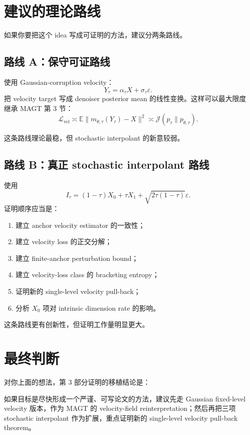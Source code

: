 \documentclass[UTF8,11pt]{ctexart}
\newcommand{\E}{\mathbb{E}}
\begin{document}
\section{建议的理论路线}

如果你要把这个 idea 写成可证明的方法，建议分两条路线。

\subsection{路线 A：保守可证路线}

使用 Gaussian-corruption velocity：
\[
Y_\tau=\alpha_\tau X+\sigma_\tau\varepsilon.
\]
把 velocity target 写成 denoiser posterior mean 的线性变换。这样可以最大限度继承 MAGT 第 3 节：
\[
\mathcal L_{\mathrm{vel}}
\asymp
\E\|m_{\theta,\tau}(Y_\tau)-X\|^2
\asymp
\mathcal J(p_\tau\|p_{\theta,\tau}).
\]

这条路线理论最稳，但 stochastic interpolant 的新意较弱。

\subsection{路线 B：真正 stochastic interpolant 路线}

使用
\[
I_\tau=(1-\tau)X_0+\tau X_1+\sqrt{2\tau(1-\tau)}\varepsilon.
\]
证明顺序应当是：
\begin{enumerate}
\item 建立 anchor velocity estimator 的一致性；
\item 建立 velocity loss 的正交分解；
\item 建立 finite-anchor perturbation bound；
\item 建立 velocity-loss class 的 bracketing entropy；
\item 证明新的 single-level velocity pull-back；
\item 分析 \(X_0\) 项对 intrinsic dimension rate 的影响。
\end{enumerate}

这条路线更有创新性，但证明工作量明显更大。

\section{最终判断}

对你上面的想法，第 3 部分证明的移植结论是：
\begin{center}
\end{center}

如果目标是尽快形成一个严谨、可写论文的方法，建议先走 Gaussian fixed-level velocity 版本，作为 MAGT 的 velocity-field reinterpretation；然后再把三项 stochastic interpolant 作为扩展，重点证明新的 single-level velocity pull-back theorem。
\end{document}
